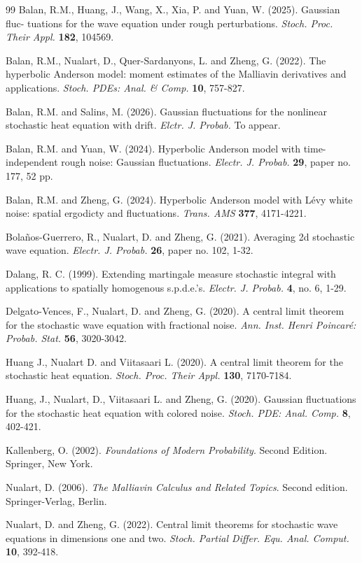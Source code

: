 \documentclass[12pt]{article}
\begin{document}
\begin{thebibliography}{99}
 Balan, R.M., Huang, J., Wang, X., Xia, P. and Yuan, W. (2025). Gaussian fluc-
tuations for the wave equation under rough perturbations. {\em Stoch. Proc. Their Appl.} {\bf 182}, 104569.

 Balan, R.M., Nualart, D., Quer-Sardanyons, L. and Zheng, G. (2022).
The hyperbolic Anderson model: moment estimates of the Malliavin derivatives and applications. {\em Stoch. PDEs: Anal. \& Comp.} {\bf 10}, 757-827.

 Balan, R.M. and Salins, M. (2026). Gaussian fluctuations for the nonlinear stochastic
heat equation with drift. {\em Elctr. J. Probab.} To appear.

 Balan, R.M. and Yuan, W. (2024). Hyperbolic Anderson model with time-independent rough noise: Gaussian fluctuations. {\em Electr. J. Probab.} {\bf 29}, paper no. 177, 52 pp.

 Balan, R.M. and Zheng, G. (2024). Hyperbolic Anderson model with L\'evy white noise: spatial ergodicty and fluctuations. {\em Trans. AMS} {\bf 377}, 4171-4221.

 Bola\~{n}os-Guerrero, R., Nualart, D. and Zheng, G. (2021). Averaging 2d stochastic wave equation. {\em Electr. J. Probab.}
{\bf 26}, paper no. 102, 1-32.

 Dalang, R. C. (1999). Extending martingale
measure stochastic integral with applications to spatially
homogenous s.p.d.e.'s. {\em Electr. J. Probab.} {\bf 4}, no. 6,
1-29. %

 Delgato-Vences, F., Nualart, D. and Zheng, G. (2020). A central limit theorem for the stochastic wave equation with fractional noise. {\em Ann. Inst. Henri Poincar\'e: Probab.
Stat.} {\bf 56}, 3020-3042. 

 Huang J., Nualart D. and Viitasaari L. (2020). A central limit theorem for the stochastic heat equation. {\em Stoch. Proc. Their Appl.} {\bf 130}, 7170-7184. 

 Huang, J., Nualart, D., Viitasaari L. and Zheng, G. (2020). Gaussian fluctuations for the stochastic heat equation with colored noise. {\em Stoch. PDE: Anal. Comp.} {\bf 8}, 402-421. 

 Kallenberg, O. (2002). {\em  Foundations of Modern Probability}. Second Edition. Springer, New York.   
    
 Nualart, D. (2006). {\em The Malliavin Calculus and Related Topics}. Second edition. Springer-Verlag, Berlin.

 Nualart, D. and Zheng, G. (2022).
 Central limit theorems for stochastic wave equations in dimensions one and two. {\em Stoch.  Partial Differ. Equ.  Anal. Comput.} {\bf 10}, 392-418.

\end{thebibliography}
\end{document}
